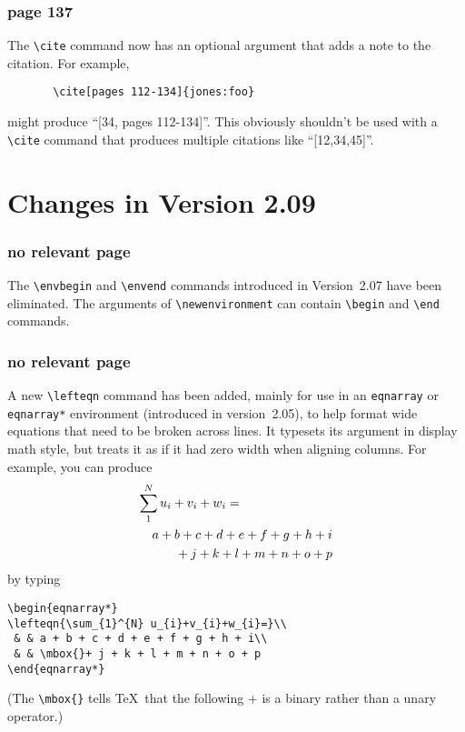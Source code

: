 \subsubsection* {page 137}

The \hbox{\verb|\cite|} command now has an optional argument that
adds a note to the citation.  For example, 
\begin{verbatim}
       \cite[pages 112-134]{jones:foo}
\end{verbatim}
might produce ``[34, pages 112-134]''.  This obviously shouldn't be
used with a \hbox{\verb|\cite|} command that produces multiple
citations like ``[12,34,45]''.

\section*{Changes in Version 2.09}

\subsubsection*{no relevant page}
The \hbox{\verb|\envbegin|} and \hbox{\verb|\envend|} commands
introduced in Version~2.07 have been eliminated. The arguments of
\hbox{\verb|\newenvironment|} can contain \hbox{\verb|\begin|} and
\hbox{\verb|\end|} commands.

\subsubsection*{no relevant page}

A new \hbox{\verb"\lefteqn"} command has been added, mainly for use in
an \hbox{\tt eqnarray} or \hbox{\tt eqnarray*} environment (introduced
in version~2.05), to help format wide equations that need to be broken
across lines.  It typesets its argument in display math style, but
treats it as if it had zero width when aligning columns.  For example,
you can produce
\begin{eqnarray*}
\lefteqn{\sum_{1}^{N} u_{i}+v_{i}+w_{i}=}\\
 & & a + b + c + d + e + f + g + h + i\\
 & & \mbox{}+ j + k + l + m + n + o + p
\end{eqnarray*}
by typing
\begin{verbatim}
\begin{eqnarray*}
\lefteqn{\sum_{1}^{N} u_{i}+v_{i}+w_{i}=}\\
 & & a + b + c + d + e + f + g + h + i\\
 & & \mbox{}+ j + k + l + m + n + o + p
\end{eqnarray*}
\end{verbatim}
(The \hbox{\verb"\mbox{}"} tells \TeX\ that the following $+$ is a binary
rather than a unary operator.)


